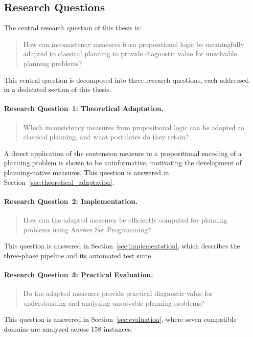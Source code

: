 \subsection{Research Questions}
\label{sec:research_questions}

The central research question of this thesis is:

\begin{quote}
    How can inconsistency measures from propositional logic be meaningfully adapted to classical planning to provide diagnostic value for unsolvable planning problems?
\end{quote}

This central question is decomposed into three research questions, each addressed in a dedicated section of this thesis.

\paragraph{Research Question~1: Theoretical Adaptation.}
\begin{quote}
    Which inconsistency measures from propositional logic can be adapted to classical planning, and what postulates do they retain?
\end{quote}
A direct application of the contension measure to a propositional encoding of a planning problem is shown to be uninformative, motivating the development of planning-native measures. This question is answered in Section~\ref{sec:theoretical_adaptation}.

\paragraph{Research Question~2: Implementation.}
\begin{quote}
    How can the adapted measures be efficiently computed for planning problems using Answer Set Programming?
\end{quote}
This question is answered in Section~\ref{sec:implementation}, which describes the three-phase pipeline and its automated test suite.

\paragraph{Research Question~3: Practical Evaluation.}
\begin{quote}
    Do the adapted measures provide practical diagnostic value for understanding and analyzing unsolvable planning problems?
\end{quote}
This question is answered in Section~\ref{sec:evaluation}, where seven compatible domains are analyzed across 158 instances.

